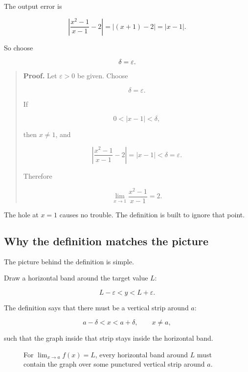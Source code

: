 The output error is

\[
\left|\frac{x^2-1}{x-1}-2\right|
=
|(x+1)-2|
=
|x-1|.
\]

So choose

\[
\delta=\varepsilon.
\]

\begin{quote}
\textbf{Proof.}
Let \(\varepsilon>0\) be given.  Choose

\[
\delta=\varepsilon.
\]

If

\[
0<|x-1|<\delta,
\]

then \(x\neq1\), and

\[
\left|\frac{x^2-1}{x-1}-2\right|
=
|x-1|
<
\delta
=
\varepsilon.
\]

Therefore

\[
\lim_{x\to1}\frac{x^2-1}{x-1}=2.
\]
\end{quote}

The hole at \(x=1\) causes no trouble.  The definition is built to ignore that point.

\subsection{Why the definition matches the picture}
\label{subsec:epsilon-delta-picture}

The picture behind the definition is simple.

Draw a horizontal band around the target value \(L\):

\[
L-\varepsilon<y<L+\varepsilon.
\]

The definition says that there must be a vertical strip around \(a\):

\[
a-\delta<x<a+\delta,
\qquad x\neq a,
\]

such that the graph inside that strip stays inside the horizontal band.

\begin{figure}[h]
\centering
{}
\caption{For \(\lim_{x\to a}f(x)=L\), every horizontal band around \(L\) must contain the graph over some punctured vertical strip around \(a\).}
\label{fig:epsilon-delta-band-strip}
\end{figure}

